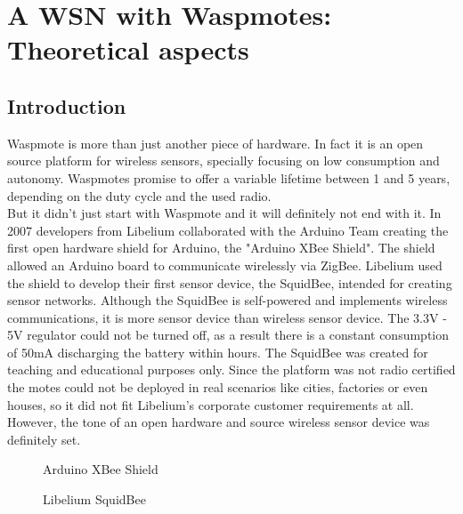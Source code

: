 \chapter{A WSN with Waspmotes: Theoretical aspects} %
\label{Chapter3} %


\section{Introduction}
Waspmote is more than just another piece of hardware. In fact it is an open source platform for wireless sensors, specially focusing on low consumption and autonomy. Waspmotes promise to offer a variable lifetime between 1 and 5 years, depending on the duty cycle and the used radio.\\ 
But it didn't just start with Waspmote and it will definitely not end with it. In 2007 developers from Libelium collaborated with the Arduino Team creating the first open hardware shield for Arduino, the "Arduino XBee Shield". The shield allowed an Arduino board to communicate wirelessly via ZigBee. Libelium used the shield to develop their first sensor device, the SquidBee, intended for creating sensor networks. Although the SquidBee is self-powered and implements wireless communications, it is more sensor device than wireless sensor device. The 3.3V - 5V regulator could not be turned off, as a result there is a constant consumption of 50mA discharging the battery within hours. The SquidBee was created for teaching and educational purposes only. Since the platform was not radio certified the motes could not be deployed in real scenarios like cities, factories or even houses, so it did not fit Libelium's corporate customer requirements at all. However, the tone of an open hardware and source wireless sensor device was definitely set.
\begin{figure}[ht]
  \hfill
  \begin{minipage}[t]{.45\textwidth}
    \begin{center}  
      \caption{Arduino XBee Shield}
      \label{fig:arduinoShield}
    \end{center}
  \end{minipage}
  \hfill
  \begin{minipage}[t]{.45\textwidth}
    \begin{center}  
      \caption{Libelium SquidBee}
      \label{fig:squidbee}
    \end{center}
  \end{minipage}
  \hfill
\end{figure}\\
